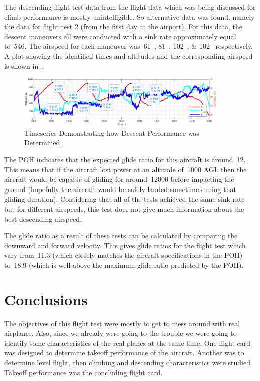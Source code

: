 \documentclass[conf]{new-aiaa}
\begin{document}
The descending flight test data from the flight data which was being discussed for climb performance is mostly unintelligible. So alternative data was found, namely the data for flight test 2 (from the first day at the airport). For this data, the descent maneuvers all were conducted with a sink rate approximately equal to~\SI{546}{\kts}.  The airspeed for each maneuver was~\SIlist{61;81;102;102}{\kts} respectively. A plot showing the identified times and altitudes and the corresponding airspeed is shown in~.

\begin{figure}[htp!]
\centering
	\includegraphics[height=1.0in]{DescentID.png}
	\caption{Timeseries Demonstrating how Descent Performance was Determined.}
	\label{descentid}
\end{figure}

The POH indicates that the expected glide ratio for this aircraft is around~\num{12}. This means that if the aircraft lost power at an altitude of~\SI{1000}{\foot} AGL then the aircraft would be capable of gliding for around~\SI{12000}{\foot} before impacting the ground (hopefully the aircraft would be safely landed sometime during that gliding duration). Considering that all of the tests achieved the same sink rate but for different airspeeds, this test does not give much information about the best descending airspeed.

The glide ratio as a result of these tests can be calculated by comparing the downward and forward velocity. This gives glide ratios for the flight test which vary from~\num{11.3} (which closely matches the aircraft specifications in the POH) to~\num{18.9} (which is well above the maximum glide ratio predicted by the POH).

\FloatBarrier

\section{Conclusions}

The objectives of this flight test were mostly to get to mess around with real airplanes. Also, since we already were going to the trouble we were going to identify some characteristics of the real planes at the same time. One flight card was designed to determine takeoff performance of the aircraft. Another was to determine level flight, then climbing and descending characteristics were studied. Takeoff performance was the concluding flight card.
\end{document}
